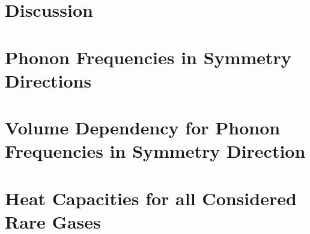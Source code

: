 \documentclass[11pt]{article}
\newlength\figureheight
\newlength\figurewidth
\newif\iftikz
\begin{document}
\iftikz
\begin{figure}[H]
	\centering
	\setlength\figureheight{4cm} 
	\setlength\figurewidth{15cm}
	
	\caption{We can see the volume dependency of the phonon frequencies in the different symmetry directions. }
	\label{fig:ArVolDepResult}
\end{figure}
\fi

\iftikz
\begin{figure}[H]
	\centering
	\setlength\figureheight{5cm} 
	\setlength\figurewidth{12cm}
	
	\caption{Here we can see the two models for the heat capacity approaching each other in the high temperature limits.}
	\label{fig:ArCvResult}
\end{figure}
\fi
\section{Discussion}
\appendix
\section{Phonon Frequencies in Symmetry Directions}
\iftikz
\begin{figure}[H]
	\centering
	\setlength\figureheight{15cm} 
	\setlength\figurewidth{15cm}
	
	\caption{The dispersion relation plotted in different symmetry directions for different rare gases. The x-axis shows the position in the lattice as it goes in different symmetry directions.}
	\label{fig:Freq}
\end{figure}
\fi
\newpage
\section{Volume Dependency for Phonon Frequencies in Symmetry Direction}
\iftikz
\begin{figure}[H]
	\centering
	\setlength\figureheight{18cm} 
	\setlength\figurewidth{14cm}
	
	\caption{The dispersion relation plotted in different symmetry directions for different rare gases.}
	\label{fig:VolDep}
\end{figure}
\fi
\newpage

\newpage
\section{Heat Capacities for all Considered Rare Gases}
\iftikz
\begin{figure}[H]
	\centering
	\setlength\figureheight{16cm} 
	\setlength\figurewidth{14cm}
	
	\caption{The dispersion relation plotted in different symmetry directions for different rare gases.}
	\label{fig:Cv}
\end{figure}
\fi
\end{document}
